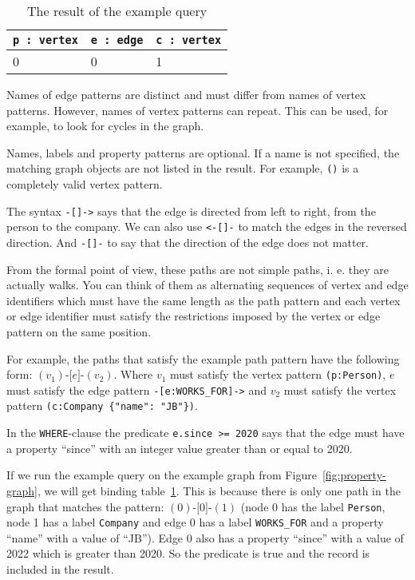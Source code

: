 \documentclass[14pt]{constructor-thesis}
\theoremstyle{definition}
\newcommand{\pathstart}[1]{(#1)}
\newcommand{\pathhop}[3]{#1 \texttt{-[} #2 \texttt{]-} (#3)}
\begin{document}
\begin{table}[b]
  \centering
  
  \begin{tabular}{ |p{3cm}|p{3cm}|p{3cm}|  }
    \hline
    \texttt{p : vertex} & \texttt{e : edge} & \texttt{c : vertex} \\
    \hline
    0 & 0 & 1 \\
    \hline
  \end{tabular}

  \caption{The result of the example query}
  \label{tab:example-query-binding-table}
\end{table}

Names of edge patterns are distinct and must differ from names of vertex patterns. However, names of vertex patterns can repeat. This can be used, for example, to look for cycles in the graph.

Names, labels and property patterns are optional. If a name is not specified, the matching graph objects are not listed in the result. For example, \texttt{()} is a completely valid vertex pattern.

The syntax \texttt{-[]->} says that the edge is directed from left to right, from the person to the company. We can also use \texttt{<-[]-} to match the edges in the reversed direction. And \texttt{-[]-} to say that the direction of the edge does not matter.

From the formal point of view, these paths are not simple paths, i. e. they are actually walks. You can think of them as alternating sequences of vertex and edge identifiers which must have the same length as the path pattern and each vertex or edge identifier must satisfy the restrictions imposed by the vertex or edge pattern on the same position.

For example, the paths that satisfy the example path pattern have the following form: $\pathhop{\pathstart{v_1}}{e}{v_2}$. Where $v_1$ must satisfy the vertex pattern \verb+(p:Person)+, $e$ must satisfy the edge pattern \verb+-[e:WORKS_FOR]->+ and $v_2$ must satisfy the vertex pattern \verb+(c:Company {"name": "JB"})+.

In the \texttt{WHERE}-clause the predicate \verb+e.since >= 2020+ says that the edge must have a property ``since'' with an integer value greater than or equal to 2020.


If we run the example query on the example graph from Figure~\ref{fig:property-graph}, we will get binding table~\ref{tab:example-query-binding-table}. This is because there is only one path in the graph that matches the pattern: $\pathhop{\pathstart{0}}{0}{1}$ (node 0 has the label \texttt{Person}, node 1 has a label \texttt{Company} and edge 0 has a label \texttt{WORKS\_FOR} and a property ``name'' with a value of ``JB''). Edge 0 also has a property ``since'' with a value of 2022 which is greater than 2020. So the predicate is true and the record is included in the result.
\end{document}
